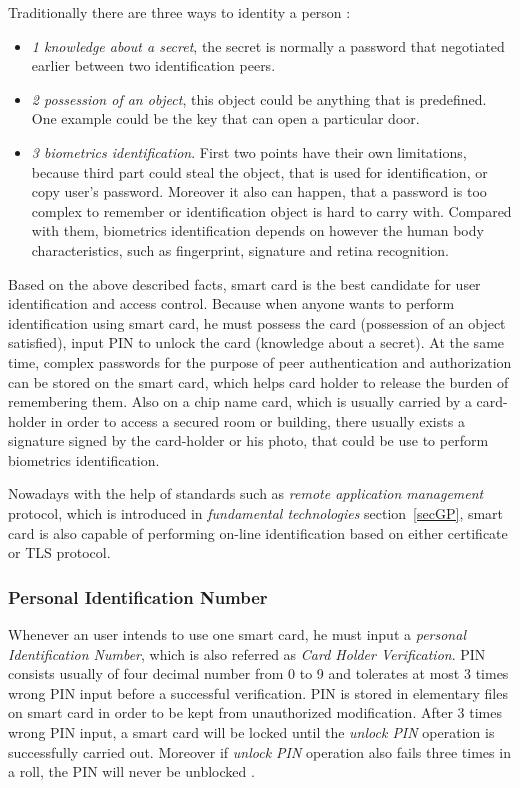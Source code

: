 Traditionally there are three ways to identity a person \cite{handbuch}:
\begin{itemize}
\item \emph{1 knowledge about a secret}, the secret is normally a password that negotiated earlier between two identification peers.
\item \emph{2 possession of an object}, this object could be anything that is predefined. One example could be the key that can open a particular door.
\item \emph{3 biometrics identification}. First two points have their own limitations, because third part could steal the object, that is used for identification, or copy user's password. Moreover it also can happen, that a password is too complex to remember or identification object is hard to carry with. Compared with them, biometrics identification depends on however the human body characteristics, such as fingerprint, signature and retina recognition.
\end{itemize}
Based on the above described facts, smart card is the best candidate for user identification and access control. Because when anyone wants to perform identification using smart card, he must possess the card (possession of an object satisfied), input PIN to unlock the card (knowledge about a secret). At the same time, complex passwords for the purpose of peer authentication and authorization can be stored on the smart card, which helps card holder to release the burden of remembering them. Also on a chip name card, which is usually carried by a card-holder in order to access a secured room or building, there usually exists a signature signed by the card-holder or his photo, that could be use to perform biometrics identification. 

Nowadays with the help of standards such as \emph{remote application management} protocol, which is introduced in \emph{fundamental technologies} section~\ref{secGP}, smart card is also capable of performing on-line identification based on either certificate or TLS protocol.

\subsubsection{Personal Identification Number}
Whenever an user intends to use one smart card, he must input a \emph{personal Identification Number}, which is also referred as \emph{Card Holder Verification}. PIN consists usually of four decimal number from 0 to 9 and tolerates at most 3 times wrong PIN input before a successful verification. PIN is stored in elementary files  \cite{smart_card_access} on smart card in order to be kept from unauthorized modification. After 3 times wrong PIN input, a smart card will be locked until the \emph{unlock PIN} operation is successfully carried out. Moreover if \emph{unlock PIN} operation also fails three times in a roll, the PIN will never be unblocked \cite{smart_card_access}.

